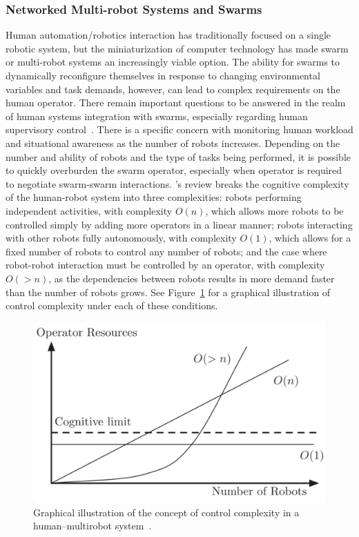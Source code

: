 \subsubsection{Networked Multi-robot Systems and Swarms}
Human automation/robotics interaction has traditionally focused on a single robotic system, but the miniaturization of computer technology has made swarm or multi-robot systems an increasingly viable option.
The ability for swarms to dynamically reconfigure themselves in response to changing environmental variables and task demands, however, can lead to complex requirements on the human operator.
There remain important questions to be answered in the realm of human systems integration with swarms, especially regarding human supervisory control~\citep{kolling_human_2016}.
There is a specific concern with monitoring human workload and situational awareness as the number of robots increases.
Depending on the number and ability of robots and the type of tasks being performed, it is possible to quickly overburden the swarm operator, especially when operator is required to negotiate swarm-swarm interactions.
\citeauthor{kolling_human_2016}'s \citeyear{kolling_human_2016} review breaks the cognitive complexity of the human-robot system into three complexities: robots performing independent activities, with complexity $O(n)$, which allows more robots to be controlled simply by adding more operators in a linear manner; robots interacting with other robots fully autonomously, with complexity $O(1)$, which allows for a fixed number of robots to control any number of robots; and the case where robot-robot interaction must be controlled by an operator, with complexity $O(>n)$, as the dependencies between robots results in more demand faster than the number of robots grows.
See Figure~\ref{figure-hari:controlcomplexity} for a graphical illustration of control complexity under each of these conditions.

\begin{figure}[b!]
    \begin{center}
        \includegraphics[width=0.8\linewidth]{figures/TradeStudy/figure2.png}
        \caption[Control complexity in a human–multirobot system]{Graphical illustration of the concept of control complexity in a human–multirobot system~\citep{kolling_human_2016}.}
        \label{figure-hari:controlcomplexity}
    \end{center}
\end{figure}

